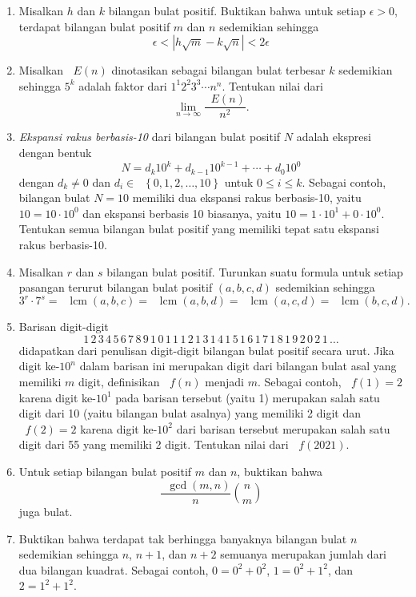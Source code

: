 \documentclass[12pt]{article}
\newcommand*\lrbr[1]{\mathop{}\!\left\lbrace#1\right\rbrace}
\newcommand*\func[2]{\mathop{}\!{#1}{\left({#2}\right)}}
\DeclareMathOperator{\lcm}{lcm}				%
\begin{document}
\begin{enumerate}[leftmargin=*]
		\item Misalkan $ h $ dan $ k $ bilangan bulat positif. Buktikan bahwa untuk setiap $ \epsilon > 0 $, terdapat bilangan bulat positif $ m $ dan $ n $ sedemikian sehingga
		\[ \epsilon < \left|h\sqrt{m} - k\sqrt{n}\right| < 2\epsilon \]
		\item Misalkan $ \func{E}{n} $ dinotasikan sebagai bilangan bulat terbesar $ k $ sedemikian sehingga $ 5^{k} $ adalah faktor dari $ 1^{1}2^{2}3^{3} \cdots n^{n} $. Tentukan nilai dari
		\[ \lim_{n \to \infty}{\frac{\func{E}{n}}{n^{2}}}. \]
		\item \textit{Ekspansi rakus berbasis-10} dari bilangan bulat positif $ N $ adalah ekspresi dengan bentuk
		\[ N = d_{k}10^{k} + d_{k - 1}10^{k - 1} + \cdots + d_{0}10^{0} \]
		dengan $ d_{k} \ne 0 $ dan $ d_{i} \in \lrbr{0, 1, 2, \dots, 10} $ untuk $ 0 \leq i \leq k $. Sebagai contoh, bilangan bulat $ N = 10 $ memiliki dua ekspansi rakus berbasis-10, yaitu $ 10 = 10 \cdot 10^{0} $ dan ekspansi berbasis 10 biasanya, yaitu $ 10 = 1 \cdot 10^{1} + 0 \cdot 10^{0} $. Tentukan semua bilangan bulat positif yang memiliki tepat satu ekspansi rakus berbasis-10.
		\item Misalkan $ r $ dan $ s $ bilangan bulat positif. Turunkan suatu formula untuk setiap pasangan terurut bilangan bulat positif $ \left(a, b, c, d\right) $ sedemikian sehingga
		\[ 3^{r} \cdot 7^{s} = \func{\lcm}{a, b, c} = \func{\lcm}{a, b, d} = \func{\lcm}{a, c, d} = \func{\lcm}{b, c, d}. \]
		\item Barisan digit-digit
		\[ 1 \, 2 \, 3 \, 4 \, 5 \, 6 \, 7 \, 8 \, 9 \, 1 \, 0 \, 1 \, 1 \, 1 \, 2 \, 1 \, 3 \, 1 \, 4 \, 1 \, 5 \, 1 \, 6 \, 1 \, 7 \, 1 \, 8 \, 1 \, 9 \, 2 \, 0 \, 2 \, 1 \, \dots \]
		didapatkan dari penulisan digit-digit bilangan bulat positif secara urut. Jika digit ke-$ 10^{n} $ dalam barisan ini merupakan digit dari bilangan bulat asal yang memiliki $ m $ digit, definisikan $ \func{f}{n} $ menjadi $ m $. Sebagai contoh, $ \func{f}{1} = 2 $ karena digit ke-$ 10^{1} $ pada barisan tersebut (yaitu 1) merupakan salah satu digit dari 10 (yaitu bilangan bulat asalnya) yang memiliki 2 digit dan $ \func{f}{2} = 2 $ karena digit ke-$ 10^{2} $ dari barisan tersebut merupakan salah satu digit dari 55 yang memiliki 2 digit. Tentukan nilai dari $ \func{f}{2021} $.
		\item Untuk setiap bilangan bulat positif $ m $ dan $ n $, buktikan bahwa
		\[ \frac{\func{\gcd}{m, n}}{n}\binom{n}{m} \]
		juga bulat.
		\item Buktikan bahwa terdapat tak berhingga banyaknya bilangan bulat $ n $ sedemikian sehingga $ n $, $ n + 1 $, dan $ n + 2 $ semuanya merupakan jumlah dari dua bilangan kuadrat. Sebagai contoh, $ 0 = 0^{2} + 0^{2} $, $ 1 = 0^{2} + 1^{2} $, dan $ 2 = 1^{2} + 1^{2} $.

\end{enumerate}
\end{document}
